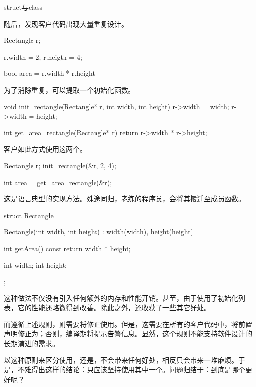 \begin{content}
\begin{episode}{struct与class}
\begin{content}
随后，发现客户代码出现大量重复设计。

\begin{c++}
Rectangle r;

r.width = 2;
r.heigth = 4;

bool area = r.width * r.height;
\end{c++}

为了消除重复，可以提取一个初始化函数。

\begin{c++}
void init_rectangle(Rectangle* r, int width, int height) {
  r->width = width;
  r->width = height;
}

int get_area_rectangle(Rectangle* r) {
  return r->width * r->height;
}
\end{c++}

客户如此方式使用这两个。

\begin{c++}
Rectangle r;
init_rectangle(&r, 2, 4);

int area = get_area_rectangle(&r);
\end{c++}

这是\clang{}语言典型的实现方法。殊途同归，老练的程序员，会将其搬迁至成员函数。

\begin{c++}
struct Rectangle {
  Rectangle(int width, int height) : width(width), height(height) {
  }

  int getArea() const {
    return width * height;
  }

  int width;
  int height;
};
\end{c++}

这种做法不仅没有引入任何额外的内存和性能开销。甚至，由于使用了初始化列表，它的性能还略微得到改善。除此之外，还收获了一些其它好处。

\begin{enum}
\end{enum}

而遵循上述规则，则需要将修正使用。但是，这需要在所有的客户代码中，将前置声明修正为；否则，编译期将提示告警信息。显然，这个规则不能支持软件设计的长期演进的需求。

以这种原则来区分使用，还是，不会带来任何好处，相反只会带来一堆麻烦。于是，不难得出这样的结论：只应该坚持使用其中一个。问题归结于：到底是哪个更好呢？


\end{content}
\end{episode}
\end{content}
